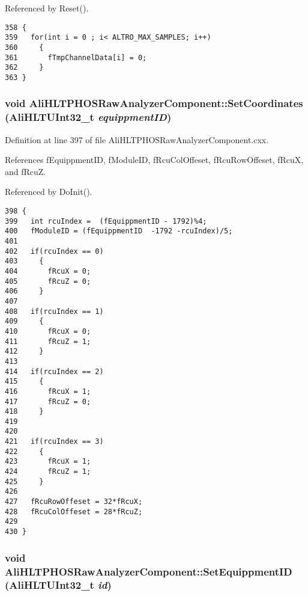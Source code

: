 Referenced by Reset().

\footnotesize\begin{verbatim}358 {
359   for(int i = 0 ; i< ALTRO_MAX_SAMPLES; i++)
360     {
361       fTmpChannelData[i] = 0;
362     }
363 }
\end{verbatim}\normalsize 


\subsubsection{\setlength{\rightskip}{0pt plus 5cm}void Ali\-HLTPHOSRaw\-Analyzer\-Component::Set\-Coordinates (Ali\-HLTUInt32\_\-t {\em equippment\-ID})}\label{classAliHLTPHOSRawAnalyzerComponent_AliHLTPHOSRawAnalyzerPeakFinderComponenta12}




Definition at line 397 of file Ali\-HLTPHOSRaw\-Analyzer\-Component.cxx.

References f\-Equippment\-ID, f\-Module\-ID, f\-Rcu\-Col\-Offeset, f\-Rcu\-Row\-Offeset, f\-Rcu\-X, and f\-Rcu\-Z.

Referenced by Do\-Init().

\footnotesize\begin{verbatim}398 {
399   int rcuIndex =  (fEquippmentID - 1792)%4;
400   fModuleID = (fEquippmentID  -1792 -rcuIndex)/5;
401 
402   if(rcuIndex == 0)
403     {
404       fRcuX = 0; 
405       fRcuZ = 0;
406     }
407 
408   if(rcuIndex == 1)
409     {
410       fRcuX = 0; 
411       fRcuZ = 1;
412     }
413  
414   if(rcuIndex == 2)
415     {
416       fRcuX = 1; 
417       fRcuZ = 0;
418     }
419 
420 
421   if(rcuIndex == 3)
422     {
423       fRcuX = 1; 
424       fRcuZ = 1;
425     }
426 
427   fRcuRowOffeset = 32*fRcuX;
428   fRcuColOffeset = 28*fRcuZ;
429 
430 }
\end{verbatim}\normalsize 


\subsubsection{\setlength{\rightskip}{0pt plus 5cm}void Ali\-HLTPHOSRaw\-Analyzer\-Component::Set\-Equippment\-ID (Ali\-HLTUInt32\_\-t {\em id})}\label{classAliHLTPHOSRawAnalyzerComponent_AliHLTPHOSRawAnalyzerPeakFinderComponenta10}




